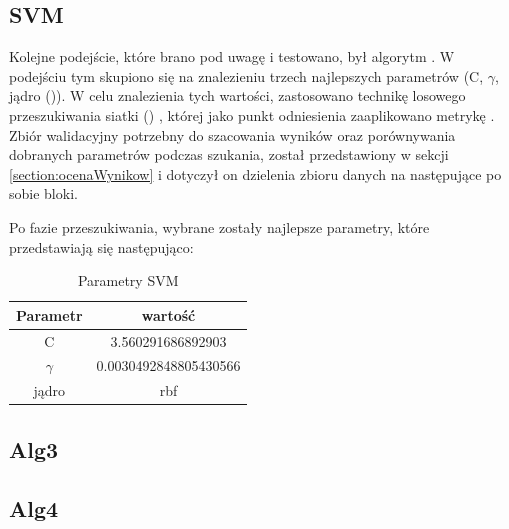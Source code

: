         \subsection{SVM}
        Kolejne podejście, które brano pod uwagę i testowano, był algorytm . W podejściu tym skupiono się na znalezieniu trzech najlepszych parametrów (C, $\gamma$, jądro ()). W celu znalezienia tych wartości, zastosowano technikę losowego przeszukiwania siatki () \cite{SKcv}, której jako punkt odniesienia zaaplikowano metrykę  \cite{SKf1}. Zbiór walidacyjny potrzebny do szacowania wyników oraz porównywania dobranych parametrów podczas szukania, został przedstawiony w sekcji \ref{section:ocenaWynikow} i dotyczył on dzielenia zbioru danych na następujące po sobie bloki.
        
        Po fazie przeszukiwania, wybrane zostały najlepsze parametry, które przedstawiają się następująco:
        \begin{table}[H]
            \centering
             \caption{Parametry SVM}
            \label{tab:my_label}
            \begin{tabular}{| c c |}
            \hline
                 Parametr & wartość \\ \hline \hline
                 C & 3.560291686892903 \\ \hline
                 $\gamma$ & 0.0030492848805430566 \\ \hline
                 jądro & rbf \\ \hline
            \end{tabular}
        \end{table}
        \subsection{Alg3}
        \subsection{Alg4}